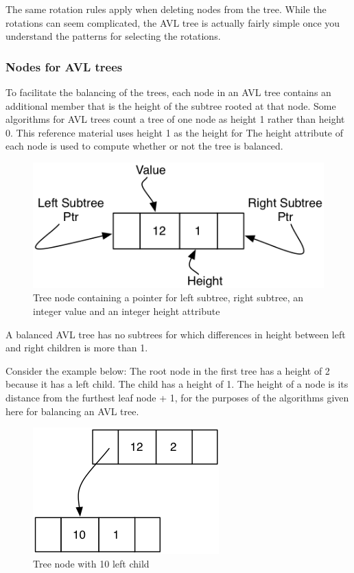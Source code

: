The same rotation rules apply when deleting nodes from the tree. While the rotations can seem complicated, the AVL tree is actually fairly simple once you understand the patterns for selecting the rotations.




\subsubsection{Nodes for AVL trees}

To facilitate the balancing of the trees, each node in an AVL tree contains an additional member that is the height of the subtree rooted at that node.   Some algorithms for AVL trees count a tree of one node as height 1 rather than height 0.     This reference material uses height 1 as the height for The height attribute of each node is used to compute whether or not the tree is balanced.

\begin{figure}[H]
\centering
\includegraphics{pictures/tree12.png}
\caption{Tree node containing a pointer for left subtree, right subtree, an integer value and an integer height attribute}
\label{fig:tree12}
\end{figure}

A balanced AVL tree has no subtrees for which differences in height between left and right children is more than 1.

Consider the example below: The root node in the first tree has a height of 2 because it has a left child. The child has a height of 1.  The height of a node is its distance from the furthest leaf node + 1, for the purposes of the algorithms  given here for balancing an AVL tree.

\begin{figure}[H]
\centering
\includegraphics{pictures/tree13.png}
\caption{Tree node with 10 left child}
\label{fig:tree13}
\end{figure}


